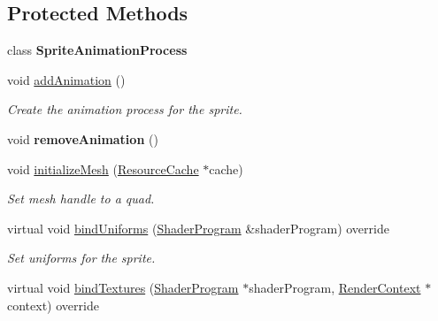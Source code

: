 \subsection*{Protected Methods}
\begin{DoxyCompactItemize}
\item 
\mbox{\label{classrev_1_1_sprite_af92e138d12047b922ceef546a7a75e87}} 
class {\bfseries Sprite\+Animation\+Process}
\item 
\mbox{\label{classrev_1_1_sprite_a44f5fac62095914e4a73496891d3213f}} 
void \mbox{\hyperlink{classrev_1_1_sprite_a44f5fac62095914e4a73496891d3213f}{add\+Animation}} ()
\begin{DoxyCompactList}\small\item\em Create the animation process for the sprite. \end{DoxyCompactList}\item 
\mbox{\label{classrev_1_1_sprite_ac884cb593e970aca9165bc027b1bf169}} 
void {\bfseries remove\+Animation} ()
\item 
\mbox{\label{classrev_1_1_sprite_ae57b7c8a1746fd2a22feae930ae594de}} 
void \mbox{\hyperlink{classrev_1_1_sprite_ae57b7c8a1746fd2a22feae930ae594de}{initialize\+Mesh}} (\mbox{\hyperlink{classrev_1_1_resource_cache}{Resource\+Cache}} $\ast$cache)
\begin{DoxyCompactList}\small\item\em Set mesh handle to a quad. \end{DoxyCompactList}\item 
\mbox{\label{classrev_1_1_sprite_aba856cad240a9bbdd0946de25ff89c36}} 
virtual void \mbox{\hyperlink{classrev_1_1_sprite_aba856cad240a9bbdd0946de25ff89c36}{bind\+Uniforms}} (\mbox{\hyperlink{classrev_1_1_shader_program}{Shader\+Program}} \&shader\+Program) override
\begin{DoxyCompactList}\small\item\em Set uniforms for the sprite. \end{DoxyCompactList}\item 
\mbox{\label{classrev_1_1_sprite_aadafbcedc4b5ddccf9c2683f97382413}} 
virtual void \mbox{\hyperlink{classrev_1_1_sprite_aadafbcedc4b5ddccf9c2683f97382413}{bind\+Textures}} (\mbox{\hyperlink{classrev_1_1_shader_program}{Shader\+Program}} $\ast$shader\+Program, \mbox{\hyperlink{classrev_1_1_render_context}{Render\+Context}} $\ast$context) override

\end{DoxyCompactItemize}
